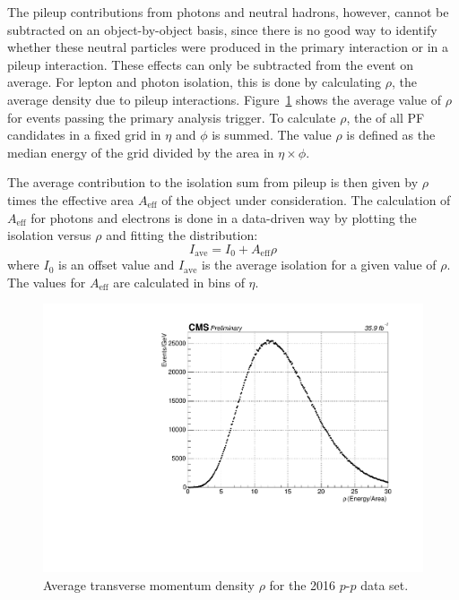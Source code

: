The pileup contributions from photons and neutral hadrons, however, cannot be subtracted on an object-by-object basis, since there is no good way to identify whether these neutral particles were produced in the primary interaction or in a pileup interaction. These effects can only be subtracted from the event on average. 
For lepton and photon isolation, this is done by calculating $\rho$, the average \pt density due to pileup interactions. Figure~\ref{fig:rho} shows the average value of $\rho$ for events passing the primary analysis trigger. To calculate $\rho$, the \pT of all PF candidates in a fixed grid in $\eta$ and $\phi$ is summed. The value $\rho$ is defined as the median energy of the grid divided by the area in $\eta \times \phi$. 

The average contribution to the isolation sum from pileup is then given by $\rho$ times the effective area $A_{\mathrm{eff}}$ of the object under consideration. The calculation of $A_{\mathrm{eff}}$ for photons and electrons is done in a data-driven way by plotting the isolation versus $\rho$ and fitting the distribution:
\begin{equation}
I_{\mathrm{ave}}  = I_0 + A_{\mathrm{eff}}\rho
\end{equation}
where $I_0$ is an offset value and $I_{\mathrm{ave}}$ is the average isolation for a given value of $\rho$. The values for $A_{\mathrm{eff}}$ are calculated in bins of $\eta$. 

 \begin{figure}[h!]
	\centering
	\includegraphics[width=0.8\linewidth]{Figures/EventReconstruction/rho.pdf}
       \caption{Average transverse momentum density $\rho$ for the 2016 $p$-$p$ data set. }
       \label{fig:rho}
\end{figure}


